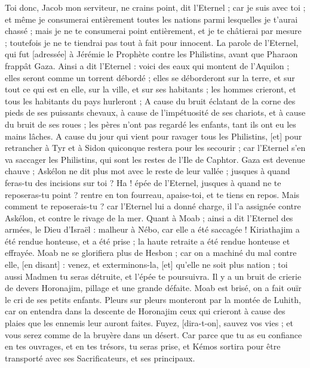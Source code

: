 \begin{multicols}{2}
Toi donc, Jacob mon serviteur, ne crains point, dit l'Eternel ; car je suis avec toi ; et même je consumerai entièrement toutes les nations parmi lesquelles je t'aurai chassé ; mais je ne te consumerai point entièrement, et je te châtierai par mesure ; toutefois je ne te tiendrai pas tout à fait pour innocent.
\VerseOne{}La parole de l'Eternel, qui fut [adressée] à Jérémie le Prophète contre les Philistins, avant que Pharaon frappât Gaza.
Ainsi a dit l'Eternel : voici des eaux qui montent de l'Aquilon ; elles seront comme un torrent débordé ; elles se déborderont sur la terre, et sur tout ce qui est en elle, sur la ville, et sur ses habitants ; les hommes crieront, et tous les habitants du pays hurleront ;
A cause du bruit éclatant de la corne des pieds de ses puissants chevaux, à cause de l'impétuosité de ses chariots, et à cause du bruit de ses roues ; les pères n'ont pas regardé les enfants, tant ils ont eu les mains lâches.
A cause du jour qui vient pour ravager tous les Philistins, [et] pour retrancher à Tyr et à Sidon quiconque restera pour les secourir ; car l'Eternel s'en va saccager les Philistins, qui sont les restes de l'Ile de Caphtor.
Gaza est devenue chauve ; Askélon ne dit plus mot avec le reste de leur vallée ; jusques à quand feras-tu des incisions sur toi ?
Ha ! épée de l'Eternel, jusques à quand ne te reposeras-tu point ? rentre en ton fourreau, apaise-toi, et te tiens en repos.
Mais comment te reposerais-tu ? car l'Eternel lui a donné charge, il l'a assignée contre Askélon, et contre le rivage de la mer.
\VerseOne{}Quant à Moab ; ainsi a dit l'Eternel des armées, le Dieu d'Israël : malheur à Nébo, car elle a été saccagée ! Kiriathajim a été rendue honteuse, et a été prise ; la haute retraite a été rendue honteuse et effrayée.
Moab ne se glorifiera plus de Hesbon ; car on a machiné du mal contre elle, [en disant] : venez, et exterminons-la, [et] qu'elle ne soit plus nation ; toi aussi Madmen tu seras détruite, et l'épée te poursuivra.
Il y a un bruit de crierie de devers Horonajim, pillage et une grande défaite.
Moab est brisé, on a fait ouïr le cri de ses petits enfants.
Pleurs sur pleurs monteront par la montée de Luhith, car on entendra dans la descente de Horonajim ceux qui crieront à cause des plaies que les ennemis leur auront faites.
Fuyez, [dira-t-on], sauvez vos vies ; et vous serez comme de la bruyère dans un désert.
Car parce que tu as eu confiance en tes ouvrages, et en tes trésors, tu seras prise, et Kémos sortira pour être transporté avec ses Sacrificateurs, et ses principaux.

\end{multicols}
